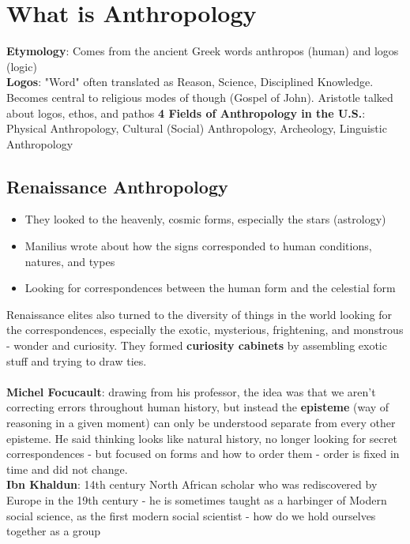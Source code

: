 \documentclass{article}
\begin{document}
\section{What is Anthropology}
\textbf{Etymology}: Comes from the ancient Greek words anthropos (human) and logos (logic) \\
\textbf{Logos}: "Word" often translated as Reason, Science, Disciplined Knowledge. Becomes central to religious modes of though (Gospel of John). Aristotle talked about logos, ethos, and pathos
\textbf{4 Fields of Anthropology in the U.S.}:  Physical Anthropology, Cultural (Social) Anthropology, Archeology, Linguistic Anthropology

\subsection{Renaissance Anthropology}
\begin{itemize}
\item They looked to the heavenly, cosmic forms, especially the stars (astrology)
\item Manilius wrote about how the signs corresponded to human conditions, natures, and types
\item Looking for correspondences between the human form and the celestial form
\end{itemize}
Renaissance elites also turned to the diversity of things in the world looking for the correspondences, especially the exotic, mysterious, frightening, and monstrous - wonder and curiosity. They formed \textbf{curiosity cabinets} by assembling exotic stuff and trying to draw ties. \\ \\
\textbf{Michel Focucault}: drawing from his professor, the idea was that we aren't correcting errors throughout human history, but instead the \textbf{episteme} (way of reasoning in a given moment) can only be understood separate from every other episteme. He said thinking looks like natural history, no longer looking for secret correspondences - but focused on forms and how to order them - order is fixed in time and did not change. \\
\textbf{Ibn Khaldun}: 14th century North African scholar who was rediscovered by Europe in the 19th century - he is sometimes taught as a harbinger of Modern social science, as the first modern social scientist - how do we hold ourselves together as a group
\end{document}
